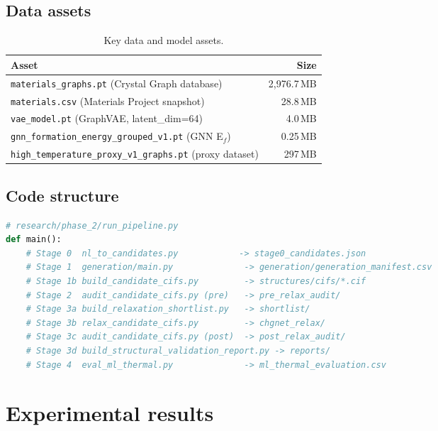 \documentclass[11pt,a4paper]{report}
\begin{document}
\section{Data assets}

\begin{table}[h]
\centering
\caption{Key data and model assets.}
\label{tab:assets}
\begin{tabular}{lr}
\toprule
\textbf{Asset} & \textbf{Size} \\
\midrule
\texttt{materials\_graphs.pt} (Crystal Graph database) & 2{,}976.7\,MB \\
\texttt{materials.csv} (Materials Project snapshot) & 28.8\,MB \\
\texttt{vae\_model.pt} (GraphVAE, latent\_dim=64) & 4.0\,MB \\
\texttt{gnn\_formation\_energy\_grouped\_v1.pt} (GNN E$_f$) & 0.25\,MB \\
\texttt{high\_temperature\_proxy\_v1\_graphs.pt} (proxy dataset) & 297\,MB \\
\bottomrule
\end{tabular}
\end{table}

\section{Code structure}

\begin{lstlisting}[language=Python,caption={Top-level orchestrator entry point.},label={lst:entry}]
# research/phase_2/run_pipeline.py
def main():
    # Stage 0  nl_to_candidates.py            -> stage0_candidates.json
    # Stage 1  generation/main.py              -> generation/generation_manifest.csv
    # Stage 1b build_candidate_cifs.py         -> structures/cifs/*.cif
    # Stage 2  audit_candidate_cifs.py (pre)   -> pre_relax_audit/
    # Stage 3a build_relaxation_shortlist.py   -> shortlist/
    # Stage 3b relax_candidate_cifs.py         -> chgnet_relax/
    # Stage 3c audit_candidate_cifs.py (post)  -> post_relax_audit/
    # Stage 3d build_structural_validation_report.py -> reports/
    # Stage 4  eval_ml_thermal.py              -> ml_thermal_evaluation.csv
\end{lstlisting}

\chapter{Experimental results}
\end{document}
